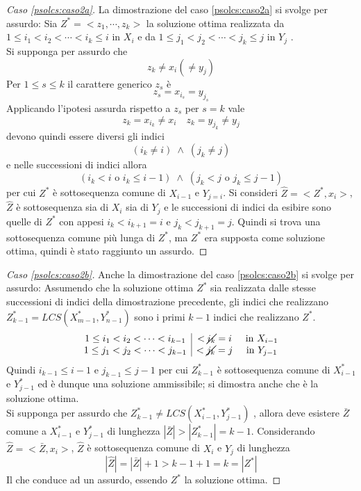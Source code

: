 \begin{proof}[Caso \ref{psolcs:caso2a}]
    La dimostrazione del caso \ref{psolcs:caso2a} si svolge per assurdo:
    Sia 
    $ Z^* = < z_1, \cdots, z_k > $
    la soluzione ottima realizzata da 
    $1 \leq i_1 < i_2 < \cdots < i_k \leq i $ in $X_i$
    e da
    $1 \leq j_1 < j_2 < \cdots < j_k \leq j $ in $Y_j$
    .\\
    Si supponga per assurdo che
    \[
        z_k \neq x_i ( \neq y_j)
    \]
    Per $1 \leq s \leq k$ il carattere generico $z_s$ è
    \[
        z_s = x_{i_s} = y_{j_s}
    \]
    Applicando l'ipotesi assurda rispetto a  $z_s$ per $s=k$ vale
    \[
        z_k = x_{i_k} \neq x_i \quad z_k = y_{j_k} \neq y_j
    \]
    devono quindi essere diversi gli indici
    \[
        (i_k \neq i) \; \wedge \; (j_k \neq j)
    \]
    e nelle successioni di indici allora
    \[
        (i_k<i \text{ o } i_k \leq i-1) 
        \; \wedge \;
        (j_k<j \text{ o } j_k \leq j-1)
    \]
    per cui $Z^*$ è sottosequenza comune di $X_{i-1}$ e $Y_{j=i}$.
    Si consideri $\widehat{Z} = < Z^* , x_i >$, $\widehat{Z}$ è sottosequenza sia di $X_i$ sia di $Y_j$
    e le successioni di indici da esibire sono quelle di $Z^*$ con appesi $i_k < i_{k+1} = i$ e $j_k < j_{k+1} = j$.
    Quindi si trova una sottosequenza comune più lunga di $Z^*$, ma $Z^*$ era supposta come soluzione ottima, quindi è stato raggiunto un assurdo.
\end{proof}

\begin{proof}[Caso \ref{psolcs:caso2b}]
    Anche la dimostrazione del caso \ref{psolcs:caso2b} si svolge per assurdo:
    Assumendo che la soluzione ottima $Z^*$ sia realizzata dalle stesse successioni di indici della dimostrazione precedente, gli indici che realizzano
    $Z_{k-1}^* = LCS(X_{m-1}^*, Y_{n-1}^*)$
    sono i primi $k-1$ indici che realizzano $Z^*$.
    \[
        \begin{array}{c|cc}
            1 \leq i_1 < i_2 < \cdots < i_{k-1} & < \cancel{i_k} = i  & \text{ in } X_{i-1}
            \\
            1 \leq j_1 < j_2 < \cdots < j_{k-1} & < \cancel{j_k} = j  & \text{ in } Y_{j-1}
        \end{array}
    \]
    Quindi $i_{k-1} \leq i-1$ e $j_{k-1} \leq j-1$
    per cui 
    $Z_{k-1}^* $ è sottosequenza comune di $X_{i-1}^* $ e $ Y_{j-1}^*$ ed è dunque una soluzione ammissibile; si dimostra anche che è la soluzione ottima.
    \\
    Si supponga per assurdo che
    $Z_{k-1}^* \neq LCS(X_{i-1}^*, Y_{j-1}^*)$
    , allora deve esistere $\bar{Z}$ comune a $X_{i-1}^* $ e $ Y_{j-1}^*$ di lunghezza
    $
    | \bar{Z} | > | Z_{k-1}^* | = k-1
    $.
    Considerando $\widehat{Z} = < \bar{Z} , x_i > $, $\widehat{Z}$ è sottosequenza comune di $X_i$ e $Y_j$ di lunghezza
    \[
        | \widehat{Z} | = | \bar{Z} | + 1 > k -1 +1 = k = | Z^* |
    \]
    Il che conduce ad un assurdo, essendo $Z^*$ la soluzione ottima.
\end{proof}

